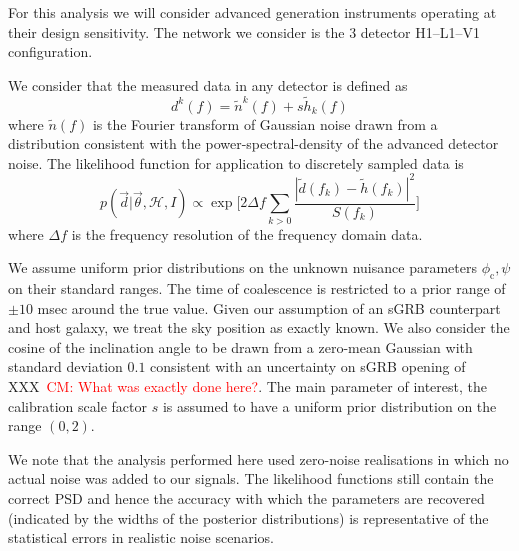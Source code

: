 \documentclass[12pt]{iopart}
\newcommand{\curlH}{\mathcal{H}}
\newcommand{\gws}{\tilde{h}}
\newcommand{\cm}[1]{\textcolor{red}{CM: #1}}
\begin{document}
For this analysis we will consider advanced generation instruments operating
at their design sensitivity.  The network we consider is the 3 detector
H1--L1--V1 configuration. 

We consider that the measured data in any detector is defined as
%
\begin{equation}
  d^{k}(f)=\tilde{n}^{k}(f)+s\gws_{k}(f)
\end{equation}
%
where $\tilde{n}(f)$ is the Fourier transform of Gaussian noise drawn from a
distribution consistent with the power-spectral-density of the advanced
detector noise.  The likelihood function for application to discretely sampled
data is 
%
\begin{equation}
  p(\vec{d} | \vec{\theta}, \curlH, I) \propto \exp\Bigg[ 2\Delta
f\sum_{k>0}\frac{|\tilde{d}(f_{k}) - \tilde{h}(f_{k})|^{2}}{S(f_{k})}\Bigg]
\end{equation}
% 
where $\Delta f$ is the frequency resolution of the frequency domain data. 

We assume uniform prior distributions on the unknown nuisance parameters
$\phi_{\mathrm{c}},\psi$ on their standard ranges. The time of coalescence is
restricted to a prior range of $\pm 10$ msec around the true value.  Given our
assumption of an \ac{sGRB} counterpart and host galaxy, we treat the sky
position as exactly known. We also consider the cosine of the inclination angle to be drawn
from a zero-mean Gaussian with standard deviation $0.1$ consistent with an
uncertainty on \ac{sGRB} opening of XXX~\cm{What was exactly done here?}.  The
main parameter of interest, the calibration scale factor $s$ is assumed to have
a uniform prior distribution on the range $(0,2)$.    

We note that the analysis performed here used zero-noise realisations in which
no actual noise was added to our signals.  The likelihood functions still
contain the correct \ac{PSD} and hence the accuracy with which the parameters
are recovered (indicated by the widths of the posterior distributions) is
representative of the statistical errors in realistic noise scenarios.

\end{document}
